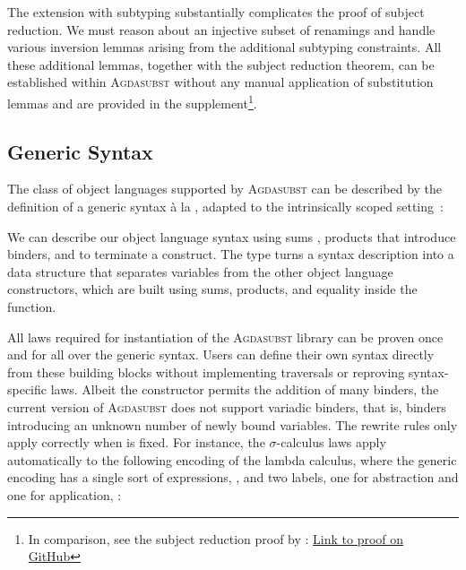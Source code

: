 \documentclass[screen,nonacm]{acmart}
\begin{document}
The extension with subtyping substantially complicates the proof of subject
reduction. We must reason about an injective subset of renamings and handle
various inversion lemmas arising from the additional subtyping constraints. All
these additional lemmas, together with the subject reduction theorem, can be
established within \textsc{Agdasubst} without any manual application of
substitution lemmas and are provided in the supplement\footnote{In comparison,
      see the subject reduction proof by \citet{saffrich:LIPIcs.ITP.2024.32}:
      \href{https://github.com/m0rphism/kitty/blob/bc86948c60f2d827593ad23e539197f9660178aa/src/Kitty/Examples/SystemFSub/SubjectReduction.agda\#L308}{Link
            to proof on GitHub}}.

\subsection{Generic Syntax}\label{sec:ext-uni}
The class of object languages supported by \textsc{Agdasubst} can be described
by the definition of a generic syntax à la
\citet{allais2021typescopesafeuniverse}, adapted to the intrinsically scoped
setting~\cite{saffrich:LIPIcs.ITP.2024.32}:

\noindent\begin{minipage}[t]{0.48\linewidth}
      \raggedright{}
      \GDesc{}
\end{minipage}
\begin{minipage}[t]{0.48\linewidth}
      \raggedright{}
      \GDenot{}
      \GTms{}
\end{minipage}

\noindent We can describe our object
language syntax using sums , products
 that introduce binders, and
 to terminate a construct. The  type turns a syntax description into a data structure that separates variables from the other object language constructors, which are built using sums, products, and equality inside the  function.

All laws required for instantiation of the \textsc{Agdasubst} library can be
proven once and for all over the generic syntax. Users can define their own
syntax directly from these building blocks without implementing traversals or
reproving syntax-specific laws. Albeit the 
constructor permits the addition of  many binders, the current
version of \textsc{Agdasubst} does not support variadic binders, that is,
binders introducing an unknown number of newly bound variables. The rewrite
rules only apply correctly when  is fixed. For instance, the
$σ$-calculus laws apply automatically to the following encoding of the lambda
calculus, where the generic encoding has a single sort of expressions,
\GSort{}, and two labels, one for abstraction and one for application,
\GLabel{}:
\end{document}
